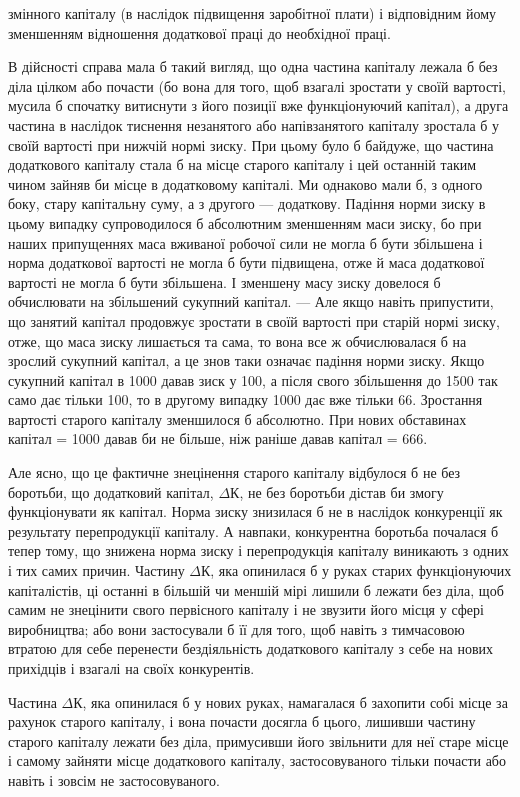 \parcont{}  %
змінного капіталу (в наслідок підвищення заробітної плати) і відповідним
йому зменшенням відношення додаткової праці до
необхідної праці.

В дійсності справа мала б такий вигляд, що одна частина капіталу
лежала б без діла цілком або почасти (бо вона для того, щоб
взагалі зростати у своїй вартості, мусила б спочатку витиснути з
його позиції вже функціонуючий капітал), а друга частина в наслідок
тиснення незанятого або напівзанятого капіталу зростала б
у своїй вартості при нижчій нормі зиску. При цьому було б байдуже,
що частина додаткового капіталу стала б на місце старого капіталу
і цей останній таким чином зайняв би місце в додатковому
капіталі. Ми однаково мали б, з одного боку, стару капітальну
суму, а з другого — додаткову. Падіння норми зиску в цьому
випадку супроводилося б абсолютним зменшенням маси зиску, бо
при наших припущеннях маса вживаної робочої сили не могла б
бути збільшена і норма додаткової вартості не могла б бути підвищена,
отже й маса додаткової вартості не могла б бути збільшена.
І зменшену масу зиску довелося б обчислювати на збільшений
сукупний капітал. — Але якщо навіть припустити, що занятий
капітал продовжує зростати в своїй вартості при старій нормі
зиску, отже, що маса зиску лишається та сама, то вона все ж
обчислювалася б на зрослий сукупний капітал, а це знов таки
означає падіння норми зиску. Якщо сукупний капітал в 1000 давав
зиск у 100, а після свого збільшення до 1500 так само дає
тільки 100, то в другому випадку 1000 дає вже тільки 66. Зростання
вартості старого капіталу зменшилося б абсолютно. При
нових обставинах капітал = 1000 давав би не більше, ніж раніше
давав капітал = 666.

Але ясно, що це фактичне знецінення старого капіталу
відбулося б не без боротьби, що додатковий капітал, $ΔК$, не без
боротьби дістав би змогу функціонувати як капітал. Норма зиску
знизилася б не в наслідок конкуренції як результату перепродукції
капіталу. А навпаки, конкурентна боротьба почалася б тепер
тому, що знижена норма зиску і перепродукція капіталу виникають
з одних і тих самих причин. Частину $ΔК$, яка опинилася б
у руках старих функціонуючих капіталістів, ці останні в більшій
чи меншій мірі лишили б лежати без діла, щоб самим не знецінити
свого первісного капіталу і не звузити його місця у
сфері виробництва; або вони застосували б її для того, щоб навіть
з тимчасовою втратою для себе перенести бездіяльність
додаткового капіталу з себе на нових прихідців і взагалі на
своїх конкурентів.

Частина $ΔК$, яка опинилася б у нових руках, намагалася б
захопити собі місце за рахунок старого капіталу, і вона почасти
досягла б цього, лишивши частину старого капіталу лежати
без діла, примусивши його звільнити для неї старе місце і самому
зайняти місце додаткового капіталу, застосовуваного тільки
почасти або навіть і зовсім не застосовуваного.
